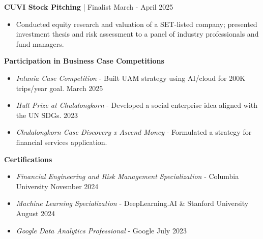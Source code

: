 \documentclass[a4paper, 11pt]{article}
\begin{document}

\textbf{CUVI Stock Pitching} | Finalist \hfill March - April 2025
\begin{itemize}[noitemsep, topsep=0pt, partopsep=0pt, parsep=0pt, leftmargin=20pt]
    \item Conducted equity research and valuation of a SET-listed company; presented investment thesis and risk assessment to a panel of industry professionals and fund managers.
\end{itemize}
\vspace{3pt}

\textbf{Participation in Business Case Competitions}
\begin{itemize}[noitemsep, topsep=0pt, partopsep=0pt, parsep=0pt, leftmargin=20pt]
    \item \textit{Intania Case Competition} - Built UAM strategy using AI/cloud for 200K trips/year goal. \hfill March 2025
    \item \textit{Hult Prize at Chulalongkorn} - Developed a social enterprise idea aligned with the UN SDGs. \hfill 2023
    \item \textit{Chulalongkorn Case Discovery x Ascend Money} - Formulated a strategy for financial services application.
\end{itemize}
\vspace{3pt}

\textbf{Certifications}
\begin{itemize}[noitemsep, topsep=0pt, partopsep=0pt, parsep=0pt, leftmargin=20pt]
    \item \textit{Financial Engineering and Risk Management Specialization} - Columbia University \hfill November 2024
    \item \textit{Machine Learning Specialization} - DeepLearning.AI \& Stanford University \hfill August 2024
    \item \textit{Google Data Analytics Professional} - Google \hfill July 2023
\end{itemize}
\end{document}
